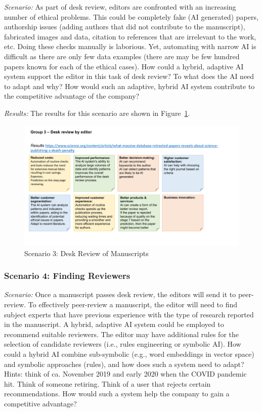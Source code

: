 \textit{Scenario:}
As part of desk review, editors are confronted with an increasing number of ethical problems. This could be
completely fake (AI generated) papers, authorship issues (adding authors that did not contribute to the manuscript),
fabricated images and data, citation to references that are irrelevant to the work, etc. Doing these checks manually
is laborious. Yet, automating with narrow AI is difficult as there are only few data examples (there are may be few
hundred papers known for each of the ethical cases). How could a hybrid, adaptive AI system support the editor in
this task of desk review? To what does the AI need to adapt and why? How would such an adaptive, hybrid AI system
contribute to the competitive advantage of the company?

\vspace{0.1cm}
\noindent\textit{Results:} The results for this scenario are shown in Figure~\ref{fig:appendix:fig3}.

\begin{figure}[h!]
    \centering
    \caption{Scenario 3: Desk Review of Manuscripts}
    \label{fig:appendix:fig3}
    \includegraphics[width=\textwidth]{figures/results_3.pdf}
\end{figure}


\subsubsection{Scenario 4: Finding Reviewers}

\textit{Scenario:}
Once a manuscript passes desk review, the editors will send it to peer-review. To effectively peer-review a
manuscript, the editor will need to find subject experts that have previous experience with the type of research
reported in the manuscript. A hybrid, adaptive AI system could be employed to recommend suitable reviewers. The
editor may have additional rules for the selection of candidate reviewers (i.e., rules engineering or symbolic AI).
How could a hybrid AI combine sub-symbolic (e.g., word embeddings in vector space) and symbolic approaches (rules),
and how does such a system need to adapt? Hints: think of ca. November 2019 and early 2020 when the COVID pandemic
hit. Think of someone retiring. Think of a user that rejects certain recommendations. How would such a system help
the company to gain a competitive advantage?

